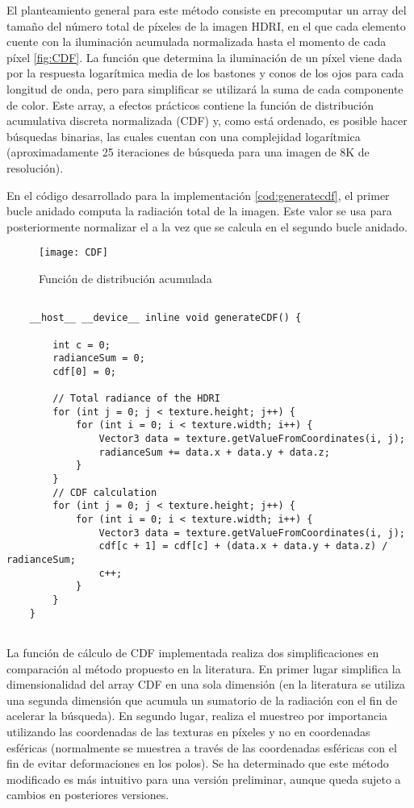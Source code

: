 El planteamiento general para este método consiste en precomputar un array del tamaño del número total de píxeles de la imagen HDRI, en el que cada elemento cuente con la iluminación acumulada normalizada hasta el momento de cada píxel \autoref{fig:CDF}.
La función que determina la iluminación de un píxel viene dada por la respuesta logarítmica media de los bastones y conos de los ojos para cada longitud de onda, pero para simplificar se utilizará la suma de cada componente de color. Este array, a efectos prácticos contiene la función de distribución acumulativa discreta normalizada (CDF) y, como está ordenado, es posible hacer búsquedas binarias, las cuales cuentan con una complejidad logarítmica (aproximadamente 25 iteraciones de búsqueda para una imagen de 8K de resolución).

En el código desarrollado para la implementación \autoref{cod:generatecdf}, el primer bucle anidado computa la radiación total de la imagen. Este valor se usa para posteriormente normalizar el  a la vez que se calcula en el segundo bucle anidado.


\begin{figure}[H]
    \centering
	\texttt{[image: CDF]}
	\caption{Función de distribución acumulada}
	\label{fig:CDF}
\end{figure}

\begin{minipage}[c]{0.95\textwidth}
\begin{lstlisting}[label={cod:generatecdf}, caption={Generación de la función de distribución acumulada}]
	
	__host__ __device__ inline void generateCDF() {

		int c = 0;
		radianceSum = 0;
		cdf[0] = 0;

		// Total radiance of the HDRI
		for (int j = 0; j < texture.height; j++) {
			for (int i = 0; i < texture.width; i++) {
				Vector3 data = texture.getValueFromCoordinates(i, j);
				radianceSum += data.x + data.y + data.z;
			}
		}
		// CDF calculation
		for (int j = 0; j < texture.height; j++) {
			for (int i = 0; i < texture.width; i++) {
				Vector3 data = texture.getValueFromCoordinates(i, j);
				cdf[c + 1] = cdf[c] + (data.x + data.y + data.z) / radianceSum;
				c++;
			}
		}
	}
	
\end{lstlisting}
\end{minipage}

La función de cálculo de CDF implementada realiza dos simplificaciones en comparación al método propuesto en la literatura. En primer lugar simplifica la dimensionalidad del array CDF en una sola dimensión (en la literatura se utiliza una segunda dimensión que acumula un sumatorio de la radiación con el fin de acelerar la búsqueda). En segundo lugar, realiza el muestreo por importancia utilizando las coordenadas de las texturas en píxeles y no en coordenadas esféricas (normalmente se muestrea a través de las coordenadas esféricas con el fin de evitar deformaciones en los polos). Se ha determinado que este método modificado es más intuitivo para una versión preliminar, aunque queda sujeto a cambios en posteriores versiones. 

